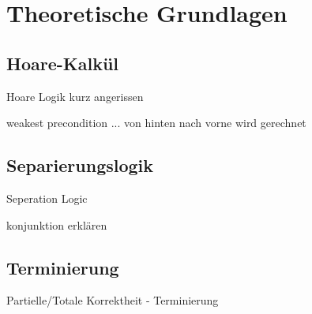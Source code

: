 ﻿
\chapter{Theoretische Grundlagen}

\section{Hoare-Kalkül}

Hoare Logik kurz angerissen

weakest precondition ... von hinten nach vorne wird gerechnet


\section{Separierungslogik}
\label{sec:theorie:seperation-logic}

Seperation Logic

konjunktion erklären


\section{Terminierung}

Partielle/Totale Korrektheit - Terminierung
